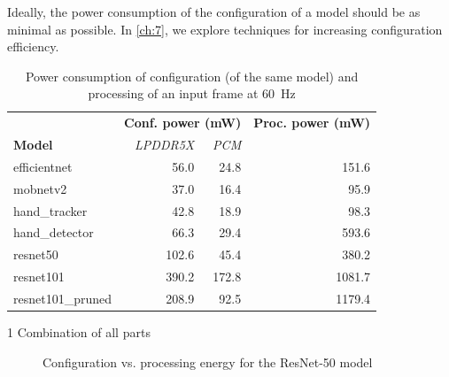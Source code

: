 Ideally, the power consumption of the configuration of a model should be as minimal as possible.
In \cref{ch:7}, we explore techniques for increasing configuration efficiency.

\begin{table}[hbtp]
    \centering
    \begin{threeparttable}
        \begin{tabular}{@{}lrrr@{}}
            \toprule
                                       & \multicolumn{2}{l}{\textbf{Conf. power (mW)}} & \textbf{Proc. power (mW)} \\ \cmidrule(l){2-3} 
            \textbf{Model}             & \textit{LPDDR5X}  & \textit{PCM}    & \\ \midrule
            efficientnet               & 56.0              & 24.8            & 151.6 \\
            mobnetv2                   & 37.0              & 16.4            & 95.9 \\
            hand\_tracker              & 42.8              & 18.9            & 98.3 \\
            hand\_detector             & 66.3              & 29.4            & 593.6 \\
            resnet50                   & 102.6             & 45.4            & 380.2 \\
            resnet101\tnote{1}         & 390.2             & 172.8           & 1081.7 \\
            resnet101\_pruned\tnote{1} & 208.9             & 92.5            & 1179.4 \\ \bottomrule
        \end{tabular}
        \begin{tablenotes}
            \item[1] Combination of all parts
        \end{tablenotes}
    \end{threeparttable}
    \caption{Power consumption of configuration (of the same model) and processing of an input frame at \SI{60}{Hz}}
    \label{tab:example_models_power_consumption}
\end{table}

\begin{figure}[hbtp]
    \centering
    \hfill
    \caption{Configuration vs. processing energy for the ResNet-50 model}
    \label{fig:resnet50_conf_proc}
\end{figure}

